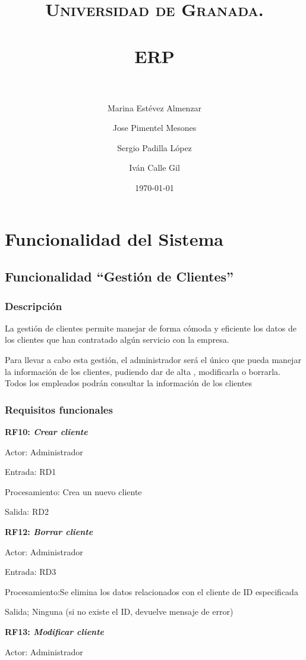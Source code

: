 \documentclass[paper=a4, fontsize=11pt, spanish]{scrartcl}
\title{
  \normalfont \normalsize
  \textsc{Universidad de Granada.} \\ [25pt]
  \horrule{0.5pt} \\[0.4cm]
  \huge ERP \\
  \horrule{2pt} \\[0.5cm]
}
\author{Marina Estévez Almenzar\\
\and
Jose Pimentel Mesones\\
\and
Sergio Padilla López\\
\and
Iván Calle Gil\\}
\date{\normalsize\today}
\begin{document}
\maketitle

\section{Funcionalidad del Sistema}

\subsection{Funcionalidad “Gestión de Clientes”}

\subsubsection{Descripción}
\setlength{\parindent}{3em} La gestión de clientes permite manejar de forma cómoda y eficiente los datos de los clientes que han contratado algún servicio con la empresa.

Para llevar a cabo esta gestión, el administrador será el único que pueda manejar la información de los clientes, pudiendo dar de alta , modificarla o borrarla.
Todos los empleados podrán consultar la información de los clientes

\subsubsection{Requisitos funcionales}
\setlength{\parindent}{0em}
\textbf{RF10: \textit{Crear cliente}}
\setlength{\parindent}{2em}

Actor: Administrador

Entrada: RD1

Procesamiento: Crea un nuevo cliente

Salida: RD2

\setlength{\parindent}{0em}
\textbf{RF12: \textit{Borrar cliente}}
\setlength{\parindent}{2em}

Actor: Administrador

Entrada: RD3

Procesamiento:Se elimina los datos relacionados con el cliente de ID especificada

Salida; Ninguna (si no existe el ID, devuelve mensaje de error)

\setlength{\parindent}{0em}
\textbf{RF13: \textit{Modificar cliente}}
\setlength{\parindent}{2em}

Actor: Administrador
\end{document}
